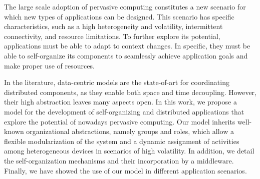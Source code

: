 The large scale adoption of pervasive computing constitutes a new scenario for which new types of applications can be designed. This scenario has specific characteristics, such as a high heterogeneity and volatility, intermittent connectivity, and resource limitations. To further explore its potential, applications must be able to adapt to context changes. In specific, they must be able to self-organize its components to seamlessly achieve application goals and make proper use of resources. 

In the literature, data-centric models are the state-of-art for coordinating distributed components, as they enable both space and time decoupling. However, their high abstraction leaves many aspects open. In this work, we propose a model for the development of self-organizing and distributed applications that explore the potential of nowadays pervasive computing. Our model inherits well-known organizational abstractions, namely groups and roles, which allow a flexible modularization of the system and a dynamic assignment of activities among heterogeneous devices in scenarios of high volatility. In addition, we detail the self-organization mechanisms and their incorporation by a middleware.  Finally, we have showed the use of our model in different application scenarios.